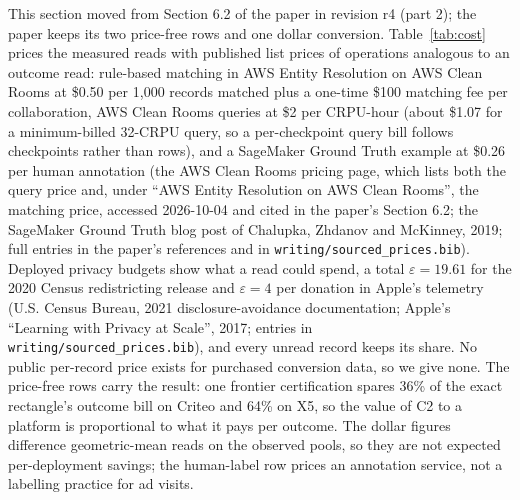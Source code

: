 \documentclass[sigconf,anonymous,review]{acmart}
\newcommand{\eps}{\varepsilon}
\begin{document}
This section moved from Section 6.2 of the paper in revision r4 (part 2); the paper keeps its two price-free rows and one dollar conversion. Table~\ref{tab:cost} prices the measured reads with published list prices of operations analogous to an outcome read: rule-based matching in AWS Entity Resolution on AWS Clean Rooms at \$0.50 per 1,000 records matched plus a one-time \$100 matching fee per collaboration, AWS Clean Rooms queries at \$2 per CRPU-hour (about \$1.07 for a minimum-billed 32-CRPU query, so a per-checkpoint query bill follows checkpoints rather than rows), and a SageMaker Ground Truth example at \$0.26 per human annotation (the AWS Clean Rooms pricing page, which lists both the query price and, under ``AWS Entity Resolution on AWS Clean Rooms'', the matching price, accessed 2026-10-04 and cited in the paper's Section 6.2; the SageMaker Ground Truth blog post of Chalupka, Zhdanov and McKinney, 2019; full entries in the paper's references and in \texttt{writing/sourced\_prices.bib}). Deployed privacy budgets show what a read could spend, a total $\eps = 19.61$ for the 2020 Census redistricting release and $\eps = 4$ per donation in Apple's telemetry (U.S. Census Bureau, 2021 disclosure-avoidance documentation; Apple's ``Learning with Privacy at Scale'', 2017; entries in \texttt{writing/sourced\_prices.bib}), and every unread record keeps its share. No public per-record price exists for purchased conversion data, so we give none. The price-free rows carry the result: one frontier certification spares 36\% of the exact rectangle's outcome bill on Criteo and 64\% on X5, so the value of C2 to a platform is proportional to what it pays per outcome. The dollar figures difference geometric-mean reads on the observed pools, so they are not expected per-deployment savings; the human-label row prices an annotation service, not a labelling practice for ad visits.
\end{document}
